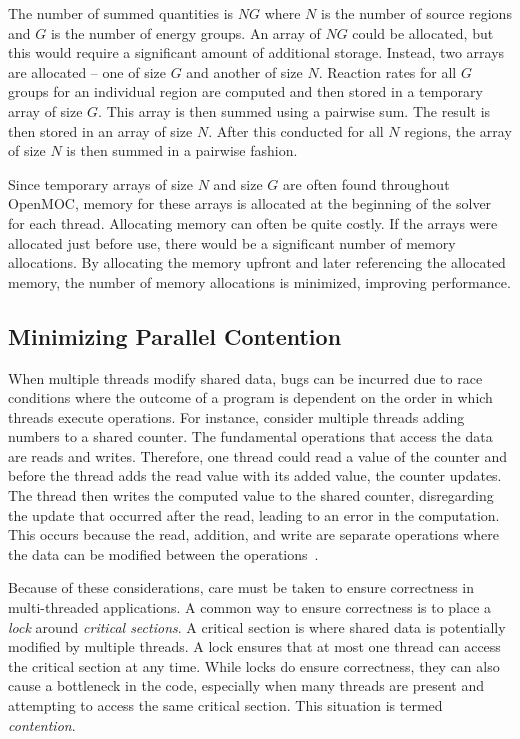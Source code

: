 The number of summed quantities is $NG$ where $N$ is the number of source regions and $G$ is the number of energy groups. An array of $NG$ could be allocated, but this would require a significant amount of additional storage. Instead, two arrays are allocated -- one of size $G$ and another of size $N$. Reaction rates for all $G$ groups for an individual region are computed and then stored in a temporary array of size $G$. This array is then summed using a pairwise sum. The result is then stored in an array of size $N$. After this conducted for all $N$ regions, the array of size $N$ is then summed in a pairwise fashion.

Since temporary arrays of size $N$ and size $G$ are often found throughout OpenMOC, memory for these arrays is allocated at the beginning of the solver for each thread. Allocating memory can often be quite costly. If the arrays were allocated just before use, there would be a significant number of memory allocations. By allocating the memory upfront and later referencing the allocated memory, the number of memory allocations is minimized, improving performance.

\subsection{Minimizing Parallel Contention}

When multiple threads modify shared data, bugs can be incurred due to race conditions where the outcome of a program is dependent on the order in which threads execute operations. For instance, consider multiple threads adding numbers to a shared counter. The fundamental operations that access the data are reads and writes. Therefore, one thread could read a value of the counter and before the thread adds the read value with its added value, the counter updates. The thread then writes the computed value to the shared counter, disregarding the update that occurred after the read, leading to an error in the computation. This occurs because the read, addition, and write are separate operations where the data can be modified between the operations~\cite{shavit}.

Because of these considerations, care must be taken to ensure correctness in multi-threaded applications. A common way to ensure correctness is to place a \textit{lock} around \textit{critical sections}. A critical section is where shared data is potentially modified by multiple threads. A lock ensures that at most one thread can access the critical section at any time. While locks do ensure correctness, they can also cause a bottleneck in the code, especially when many threads are present and attempting to access the same critical section. This situation is termed \textit{contention}.

